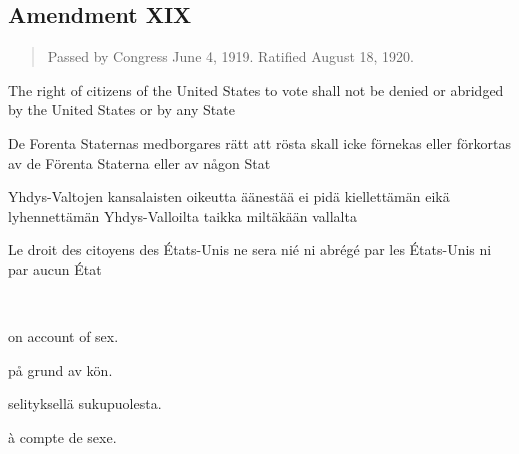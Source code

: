 \documentclass[a4paper,landscape,12pt]{article}
\begin{document}
\subsection*{Amendment XIX}
\begin{quote}\small
Passed by Congress June 4, 1919. Ratified August 18, 1920.
\end{quote}
\begin{minipage}[t]{0.22\textwidth}
	The right of citizens of the United States to vote shall not be denied or abridged by the United States or by any State
\end{minipage}\textwidth
\begin{minipage}[t]{0.22\textwidth}
	De Forenta Staternas medborgares rätt att rösta skall icke förnekas eller förkortas av de Förenta Staterna eller av någon Stat
\end{minipage}\textwidth
\begin{minipage}[t]{0.22\textwidth}
	Yhdys-Valtojen kansalaisten oikeutta äänestää ei pidä kiellettämän eikä lyhennettämän Yhdys-Valloilta taikka miltäkään vallalta
\end{minipage}\textwidth
\begin{minipage}[t]{0.22\textwidth}
	Le droit des citoyens des États-Unis ne sera nié ni abrégé par les États-Unis ni par aucun État
\end{minipage}

~

\begin{minipage}[t]{0.22\textwidth}
on account of sex.
\end{minipage}\textwidth
\begin{minipage}[t]{0.22\textwidth}
på grund av kön.
\end{minipage}\textwidth
\begin{minipage}[t]{0.22\textwidth}
selityksellä sukupuolesta.
\end{minipage}\textwidth
\begin{minipage}[t]{0.22\textwidth}
	à compte de sexe.
\end{minipage}

~
\end{document}
